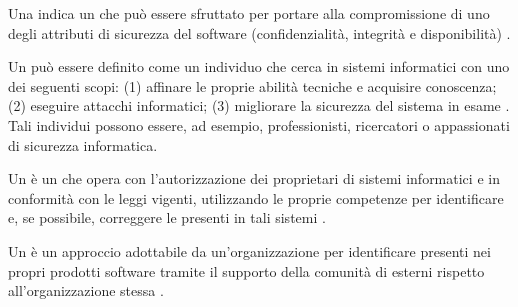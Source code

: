 \medskip

Una \vulnerability indica un \bug che può essere sfruttato per portare alla compromissione di uno degli attributi di sicurezza del software (confidenzialità, integrità e disponibilità) \cite{fryer2017bugbounty, mitropoulos2017securing}.

\medskip

Un \hacker può essere definito come un individuo che cerca \vulnerability in sistemi informatici con uno dei seguenti scopi: (1) affinare le proprie abilità tecniche e acquisire conoscenza; (2) eseguire attacchi informatici; (3) migliorare la sicurezza del sistema in esame \cite{oliver2020hacker}. Tali individui possono essere, ad esempio, professionisti, ricercatori o appassionati di sicurezza informatica.

\medskip

Un \whitehathacker è un \hacker che opera con l'autorizzazione dei proprietari di sistemi informatici e in conformità con le leggi vigenti, utilizzando le proprie competenze per identificare e, se possibile, correggere le \vulnerability presenti in tali sistemi \cite{walshe2020bountypaper}.

\medskip


\medskip

Un \CVD è un approccio adottabile da un'organizzazione per identificare \vulnerability presenti nei propri prodotti software tramite il supporto della comunità di \whitehathacker esterni rispetto all'organizzazione stessa \cite{walshe2023bountythesis2, walshe2022cvdpaper}.

